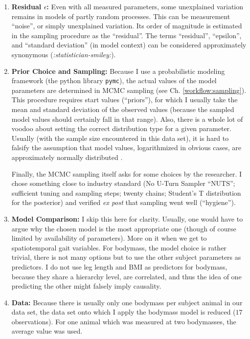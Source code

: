 \begin{enumerate}
\item \textbf{Residual \(\epsilon\):}
\label{sec:orgbf53734}
Even with all measured parameters, some unexplained variation remains in models of partly random processes.
This can be measurement ``noise'', or simply unexplained variation.
Its order of magnitude is estimated in the sampling procedure as the ``residual''.
The terms ``residual'', ``epsilon'', and ``standard deviation'' (in model context) can be considered approximately synonymous (\emph{:statistician-smiley:}).

\item \textbf{Prior Choice and Sampling:}
\label{sec:orgf31f4ce}
Because I use a probabilistic modeling framework (the python library \texttt{pymc}), the actual values of the model parameters are determined in MCMC sampling (see Ch. \ref{workflow:sampling}).
This procedure requires start values (``priors''), for which I usually take the mean and standard deviation of the observed values (because the sampled model values should certainly fall in that range).
Also, there is a whole lot of voodoo about setting the correct distribution type for a given parameter.
Usually (with the sample size encountered in this data set), it is hard to falsify the assumption that model values, logarithmized in obvious cases, are approximately normally distributed \citep{Downey2013}.

Finally, the MCMC sampling itself asks for some choices by the researcher.
I chose something close to industry standard (No U-Turn Sampler ``NUTS''; sufficient tuning and sampling steps; twenty chains; Student's T distribution for the posterior) and verified \emph{ex post} that sampling went well (``hygiene'').

\item \textbf{Model Comparison:}
\label{sec:orgd46c837}
I skip this here for clarity.
Usually, one would have to argue why the chosen model is the most appropriate one (though of course limited by availability of parameters).
More on it when we get to spatiotemporal gait variables.
For bodymass, the model choice is rather trivial, there is not many options but to use the other subject parameters as predictors.
I do not use leg length and BMI as predictors for bodymass, because they share a hierarchy level, are correlated, and thus the idea of one predicting the other might falsely imply causality.

\item \textbf{Data:}
\label{sec:org71ae22a}
Because there is usually only one bodymass per subject animal in our data set, the data set onto which I apply the bodymass model is reduced (\(17\) observations).
For one animal which was measured at two bodymasses, the average value was used.


\end{enumerate}
